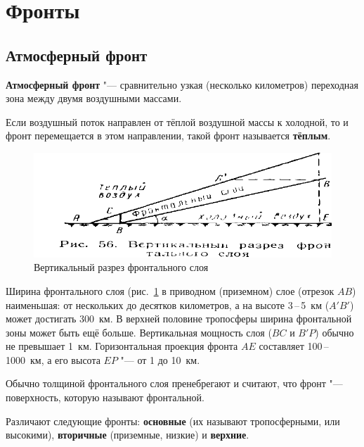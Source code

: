 \documentclass[a4paper, 12pt, twoside, final, book, russian, fittopage, cyremdash, openright]{ncc}
\newcommand{\otdo}{\,--\,}
\begin{document}
\section{Фронты}

\subsection{Атмосферный фронт}
\label{sec:front}

\textbf{Атмосферный фронт} "--- сравнительно
узкая (несколько километров) переходная зона между двумя воздушными
массами.

Если воздушный поток направлен от тёплой воздушной массы к холодной,
то и фронт перемещается в этом направлении, такой фронт называется
\textbf{тёплым}.

\begin{figure}[htb]
   \centering
   \includegraphics[scale=1.0]{05_vertical_front.pdf}
   \caption{Вертикальный разрез фронтального слоя}
   \label{fig:05_vertical_front}
\end{figure}

Ширина фронтального слоя (рис.~\ref{fig:05_vertical_front} в приводном
(приземном) слое (отрезок $AB$) наименьшая: от нескольких до десятков
километров, а на высоте 3\otdo5~км ($A'B'$) может достигать
300~км. В верхней половине тропосферы ширина фронтальной зоны может
быть ещё больше. Вертикальная мощность слоя ($BC$ и $B'P$) обычно не
превышает 1~км. Горизонтальная проекция фронта $AE$ составляет
100\otdo1000~км, а его высота $EP$ "--- от 1 до 10~км.

Обычно толщиной фронтального слоя пренебрегают и считают, что фронт
"--- поверхность, которую называют фронтальной.

Различают следующие фронты: \textbf{основные}
(их называют тропосферными, или
высокими), \textbf{вторичные}
(приземные, низкие) и
\textbf{верхние}.
\end{document}
